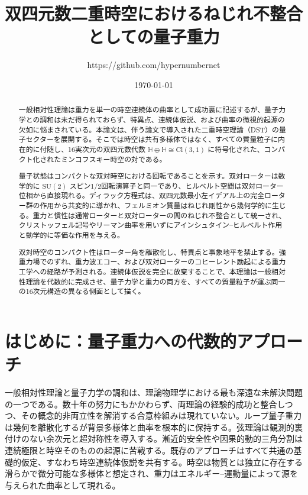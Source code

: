 \documentclass[a4paper]{article}
\title{双四元数二重時空におけるねじれ不整合としての量子重力}
\author{https://github.com/hypernumbernet}
\date{\today}
\begin{document}
\maketitle

\begin{abstract}
一般相対性理論は重力を単一の時空連続体の曲率として成功裏に記述するが、量子力学との調和は未だ得られておらず、特異点、連続体仮説、および曲率の微視的起源の欠如に悩まされている。本論文は、伴う論文で導入された二重時空理論（DST）の量子セクターを展開する。そこでは時空は共有多様体ではなく、すべての質量粒子に内在的に付随し、16実次元の双四元数代数 $\mathbb{H} \oplus \mathbb{H} \cong \mathrm{Cl}(3,1)$ に符号化された、コンパクト化されたミンコフスキー時空の対である。

量子状態はコンパクトな双対時空における回転であることを示す。双対ローターは数学的に $\mathrm{SU}(2)$ スピン1/2回転演算子と同一であり、ヒルベルト空間は双対ローター位相から直接現れる。ディラック方程式は、双四元数最小左イデアル上の完全ローター群の作用から共変的に導かれ、フェルミオン質量はねじれ剛性から幾何学的に生じる。重力と慣性は通常ローターと双対ローターの間のねじれ不整合として統一され、クリストッフェル記号やリーマン曲率を用いずにアインシュタイン--ヒルベルト作用と動学的に等価な作用を与える。

双対時空のコンパクト性はローター角を離散化し、特異点と事象地平を禁止する。強重力場でのずれ、重力波エコー、および双対ローターのコヒーレント励起による重力工学への経路が予測される。連続体仮説を完全に放棄することで、本理論は一般相対性理論を代数的に完成させ、量子力学と重力の両方を、すべての質量粒子が運ぶ同一の16次元構造の異なる側面として描く。
\end{abstract}

\section{はじめに：量子重力への代数的アプローチ}

一般相対性理論と量子力学の調和は、理論物理学における最も深遠な未解決問題の一つである。数十年の努力にもかかわらず、両理論の経験的成功と整合しつつ、その概念的非両立性を解消する合意枠組みは現れていない。ループ量子重力は幾何を離散化するが背景多様体と曲率を根本的に保持する。弦理論は観測的裏付けのない余次元と超対称性を導入する。漸近的安全性や因果的動的三角分割は連続極限と時空そのものの起源に苦戦する。既存のアプローチはすべて共通の基礎的仮定、すなわち時空連続体仮説を共有する。時空は物質とは独立に存在する滑らかで微分可能な多様体と想定され、重力はエネルギー--運動量によって源を与えられた曲率として現れる。
\end{document}

